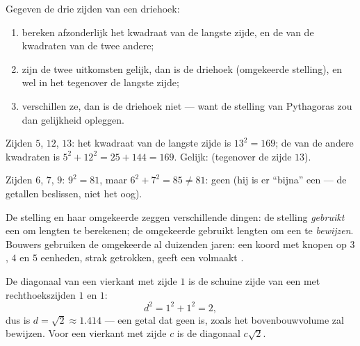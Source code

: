 \begin{method}\label{met:g8:pythagoras:test}
Gegeven de drie zijden van een driehoek:
\begin{enumerate}
  \item bereken afzonderlijk het kwadraat van de langste zijde, en de  van de
        kwadraten van de twee andere;
  \item zijn de twee uitkomsten gelijk, dan is de driehoek 
        (omgekeerde stelling), en wel in het  tegenover de langste zijde;
  \item verschillen ze, dan is de driehoek niet  --- want de stelling
        van Pythagoras zou dan gelijkheid opleggen.
\end{enumerate}
\end{method}

\begin{example}\label{ex:g8:pythagoras:test}
Zijden $5$, $12$, $13$: het kwadraat van de langste zijde is $13^2 = 169$; de 
van de andere kwadraten is $5^2 + 12^2 = 25 + 144 = 169$. Gelijk: 
(tegenover de zijde $13$).

Zijden $6$, $7$, $9$: $9^2 = 81$, maar $6^2 + 7^2 = 85 \neq 81$: geen
 (hij is er ``bijna'' een --- de getallen beslissen, niet
het oog).
\end{example}

\begin{remark}
De stelling en haar omgekeerde zeggen verschillende dingen: de stelling
\emph{gebruikt} een  om lengten te berekenen; de omgekeerde gebruikt
lengten om een  te \emph{bewijzen}. Bouwers gebruiken de omgekeerde al
duizenden jaren: een koord met knopen op $3$, $4$ en $5$ eenheden, strak
getrokken, geeft een volmaakt .
\end{remark}

\begin{example}\label{ex:g8:pythagoras:diagonal}
De diagonaal van een vierkant met zijde $1$ is de schuine zijde van een
 met rechthoekszijden $1$ en $1$:
\[
d^2 = 1^2 + 1^2 = 2 ,
\]
dus is $d = \sqrt2 \approx 1.414$ --- een getal dat geen  is, zoals het
bovenbouwvolume zal bewijzen. Voor een vierkant met zijde $c$ is de diagonaal
$c\sqrt2$.
\end{example}

